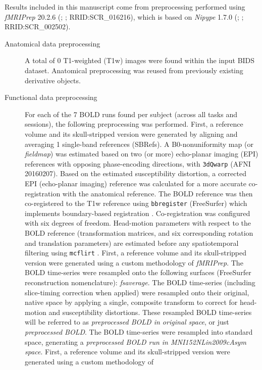 \documentclass[]{article}
\date{}
\begin{document}
Results included in this manuscript come from preprocessing performed
using \emph{fMRIPrep} 20.2.6 (\citet{fmriprep1}; \citet{fmriprep2};
RRID:SCR\_016216), which is based on \emph{Nipype} 1.7.0
(\citet{nipype1}; \citet{nipype2}; RRID:SCR\_002502).

\begin{description}
\item[Anatomical data preprocessing]
A total of 0 T1-weighted (T1w) images were found within the input BIDS
dataset. Anatomical preprocessing was reused from previously existing
derivative objects.
\item[Functional data preprocessing]
For each of the 7 BOLD runs found per subject (across all tasks and
sessions), the following preprocessing was performed. First, a reference
volume and its skull-stripped version were generated by aligning and
averaging 1 single-band references (SBRefs). A B0-nonuniformity map (or
\emph{fieldmap}) was estimated based on two (or more) echo-planar
imaging (EPI) references with opposing phase-encoding directions, with
\texttt{3dQwarp} \citet{afni} (AFNI 20160207). Based on the estimated
susceptibility distortion, a corrected EPI (echo-planar imaging)
reference was calculated for a more accurate co-registration with the
anatomical reference. The BOLD reference was then co-registered to the
T1w reference using \texttt{bbregister} (FreeSurfer) which implements
boundary-based registration \citep{bbr}. Co-registration was configured
with six degrees of freedom. Head-motion parameters with respect to the
BOLD reference (transformation matrices, and six corresponding rotation
and translation parameters) are estimated before any spatiotemporal
filtering using \texttt{mcflirt} \citep[FSL 5.0.9,][]{mcflirt}. First, a
reference volume and its skull-stripped version were generated using a
custom methodology of \emph{fMRIPrep}. The BOLD time-series were
resampled onto the following surfaces (FreeSurfer reconstruction
nomenclature): \emph{fsaverage}. The BOLD time-series (including
slice-timing correction when applied) were resampled onto their
original, native space by applying a single, composite transform to
correct for head-motion and susceptibility distortions. These resampled
BOLD time-series will be referred to as \emph{preprocessed BOLD in
original space}, or just \emph{preprocessed BOLD}. The BOLD time-series
were resampled into standard space, generating a \emph{preprocessed BOLD
run in MNI152NLin2009cAsym space}. First, a reference volume and its
skull-stripped version were generated using a custom methodology of

\end{description}
\end{document}

